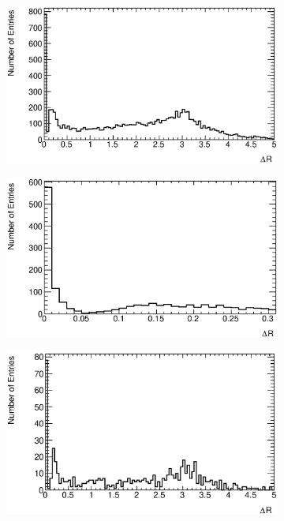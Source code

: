 \begin{figure}
\centering
        \begin{subfigure}[b]{0.5\textwidth}
                \centering
                \includegraphics[width=\textwidth]{figures/ServiceWork/EgammaL2/DR_Unmatched_L2.eps}
        \end{subfigure}%
        \begin{subfigure}[b]{0.5\textwidth}
                \centering
                \includegraphics[width=\textwidth]{figures/ServiceWork/EgammaL2/DR_Unmatched_Zoomed_L2.eps}
        \end{subfigure}%
\caption[\dr{} between offline and L2 EM object]{
\dr{} distribution between the offline EM cluster and all L2 clusters in the event, shown within the range (a) $0 - 5$ and (b) $0 - 0.3$. 
\label{SW_egamma_L2_dR}}
\medskip
        \begin{subfigure}[b]{0.5\textwidth}
                \centering
                \includegraphics[width=\textwidth]{figures/ServiceWork/EgammaEF/DR_Unmatched_EF.eps}

\end{subfigure}
\end{figure}
